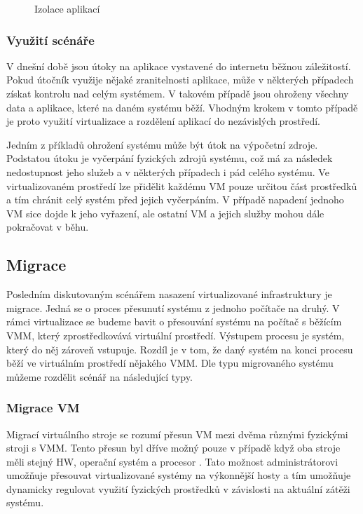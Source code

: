 \begin{figure}
    \centering    
    \caption{Izolace aplikací}
    \label{izolation}
\end{figure}

\subsubsection*{Využití scénáře}

V dnešní době jsou útoky na aplikace vystavené do internetu běžnou záležitostí. Pokud útočník využije nějaké zranitelnosti aplikace, může v některých případech získat kontrolu nad celým systémem. V takovém případě jsou
ohroženy všechny data a aplikace, které na daném systému běží. Vhodným krokem v tomto případě je proto využití virtualizace a rozdělení aplikací do nezávislých prostředí.

Jedním z příkladů ohrožení systému může být útok na výpočetní zdroje. Podstatou útoku je vyčerpání fyzických zdrojů systému, což má za následek nedostupnost jeho služeb a v některých případech i pád celého systému.
Ve virtualizovaném prostředí lze přidělit každému VM pouze určitou část prostředků a tím chránit celý systém před jejich vyčerpáním. V případě napadení jednoho VM sice dojde k jeho vyřazení, ale ostatní VM a jejich služby
mohou dále pokračovat v běhu.

\subsection{Migrace}

Posledním diskutovaným scénářem nasazení virtualizované infrastruktury je migrace. Jedná se o proces přesunutí systému z jednoho počítače na druhý. V rámci virtualizace se budeme bavit o přesouvání systému na počítač s běžícím VMM,
který zprostředkovává virtuální prostředí. Výstupem procesu je systém, který do něj zároveň vstupuje. Rozdíl je v tom, že daný systém na konci procesu běží ve virtuálním prostředí nějakého VMM. Dle typu migrovaného systému můžeme
rozdělit scénář na následující typy.

\subsubsection*{Migrace VM}

Migrací virtuálního stroje se rozumí přesun VM mezi dvěma různými fyzickými stroji s VMM. Tento přesun byl dříve možný pouze v případě když oba stroje měli stejný HW, operační systém a procesor \cite{reasons}.
Tato možnost administrátorovi umožňuje přesouvat virtualizované systémy na výkonnější hosty a tím umožňuje dynamicky regulovat využití fyzických prostředků v závislosti na aktuální zátěži systému.

